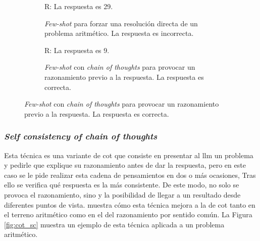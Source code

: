 \begin{figure}[H]
    \vspace{0.2cm}

    \begin{subfigure}{.48\textwidth}
        \centering
        \begin{mdframed}
          \fontsize{9.5pt}{11pt}\selectfont
        R: La respuesta es 29.
        \end{mdframed}
        \caption{\emph{Few-shot} para forzar una resolución directa de un problema aritmético. La respuesta es incorrecta.}
      \end{subfigure}\hfill
    \begin{subfigure}{.48\textwidth}
      \centering
      \begin{mdframed}
        \fontsize{9.5pt}{11pt}\selectfont
        R:  La respuesta es 9.
      \end{mdframed}
      \caption{\emph{Few-shot} con \emph{chain of thoughts} para provocar un razonamiento previo a la respuesta. La respuesta es correcta.}
    \end{subfigure}
    \label{fig:chain_of_thoughts}
\end{figure}

\subsubsection{\emph{Self consistency of chain of thoughts}}

Esta técnica es una variante de \gls{cot} que consiste en presentar al \gls{llm} un problema y pedirle que explique su razonamiento antes de dar la respuesta, pero en este caso se le pide realizar esta cadena de pensamientos en dos o más ocasiones, Tras ello se verifica qué respuesta es la más consistente. De este modo, no solo se provoca el razonamiento, sino y la posibilidad de llegar a un resultado desde diferentes puntos de vista. \citep{wangSelfConsistencyImprovesChain2023} muestra cómo esta técnica mejora a la de \gls{cot} tanto en el terreno aritmético como en el del razonamiento por sentido común. La Figura \ref{fig:cot_sc} muestra un ejemplo de esta técnica aplicada a un problema aritmético.

